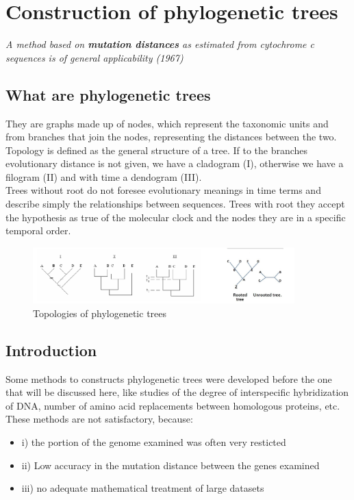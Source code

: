 \graphicspath{{chapters/11/images}}
\chapter{Construction of phylogenetic trees}
\emph{A method based on \textbf{mutation distances} as estimated from cytochrome \textit{c} sequences is of general applicability (1967)}

\section{What are phylogenetic trees}
They are graphs made up of nodes, which represent the taxonomic units and from branches that join the nodes, representing the distances between the two.
\\
Topology is defined as the general structure of a tree. If to the branches evolutionary distance is not given, we have a cladogram (I), otherwise we have a filogram (II) and with time a dendogram (III).
\\
Trees without root do not foresee evolutionary meanings in time terms and describe simply the relationships between sequences. Trees with root they accept the hypothesis as true of the molecular clock and the nodes they are in a specific
temporal order.
\begin{figure}[H]
		\centering
		\includegraphics[width=0.9\textwidth]{grams.png}
		\caption{Topologies of phylogenetic trees}
		\label{fig:1}
	\end{figure}

\section{Introduction}
Some methods to constructs phylogenetic trees were developed before the one that will be discussed here, like studies of the degree of interspecific hybridization of DNA, number of amino acid replacements between homologous proteins, etc.
These methods are not satisfactory, because:
\begin{itemize}
\item i) the portion of the genome examined was often very resticted
\item ii) Low accuracy in the mutation distance between the genes examined
\item iii) no adequate mathematical treatment of large datasets
\end{itemize}

